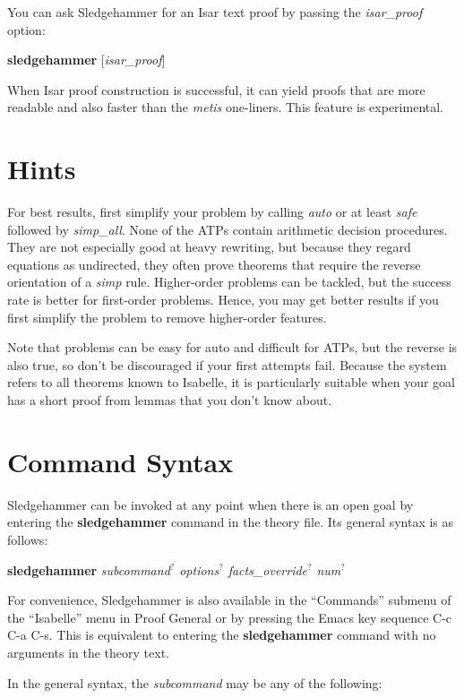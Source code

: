 \documentclass[a4paper,12pt]{article}
\begin{document}
You can ask Sledgehammer for an Isar text proof by passing the
\textit{isar\_proof} option:

\prew
\textbf{sledgehammer} [\textit{isar\_proof}]
\postw

When Isar proof construction is successful, it can yield proofs that are more
readable and also faster than the \textit{metis} one-liners. This feature is
experimental.

\section{Hints}
\label{hints}

For best results, first simplify your problem by calling \textit{auto} or at
least \textit{safe} followed by \textit{simp\_all}. None of the ATPs contain
arithmetic decision procedures. They are not especially good at heavy rewriting,
but because they regard equations as undirected, they often prove theorems that
require the reverse orientation of a \textit{simp} rule. Higher-order problems
can be tackled, but the success rate is better for first-order problems. Hence,
you may get better results if you first simplify the problem to remove
higher-order features.

Note that problems can be easy for auto and difficult for ATPs, but the reverse
is also true, so don't be discouraged if your first attempts fail. Because the
system refers to all theorems known to Isabelle, it is particularly suitable
when your goal has a short proof from lemmas that you don't know about.

\section{Command Syntax}
\label{command-syntax}

Sledgehammer can be invoked at any point when there is an open goal by entering
the \textbf{sledgehammer} command in the theory file. Its general syntax is as
follows:

\prew
\textbf{sledgehammer} \textit{subcommand\/$^?$ options\/$^?$ facts\_override\/$^?$ num\/$^?$}
\postw

For convenience, Sledgehammer is also available in the ``Commands'' submenu of
the ``Isabelle'' menu in Proof General or by pressing the Emacs key sequence C-c
C-a C-s. This is equivalent to entering the \textbf{sledgehammer} command with
no arguments in the theory text.

In the general syntax, the \textit{subcommand} may be any of the following:
\end{document}
